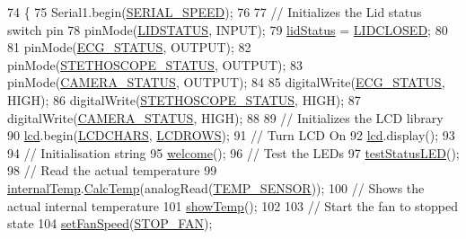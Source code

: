 \begin{DoxyCode}
\begin{DoxyCode}
\begin{DoxyCode}
\begin{DoxyCode}
74              \{
75   Serial1.begin(\hyperlink{_globals_8h_a4081bc1d938e0d9b2b0941e3a1143498}{SERIAL\_SPEED});
76 
77   \textcolor{comment}{// Initializes the Lid status switch pin}
78   pinMode(\hyperlink{_globals_8h_a9d1e04090b98f20c171c70e566a32e16}{LIDSTATUS}, INPUT);
79   \hyperlink{_meditech___chip_kit_control_panel_8pde_adea51712174a5f82a31231a67e0d4608}{lidStatus} = \hyperlink{_globals_8h_af04a3919dc1fa7d521c9514be995b43d}{LIDCLOSED};
80   
81   pinMode(\hyperlink{_globals_8h_a81c971d1ee27ca31e310c80ef260b390}{ECG\_STATUS}, OUTPUT);
82   pinMode(\hyperlink{_globals_8h_a8519a074bf27b6dcc876ce549b2f5ea7}{STETHOSCOPE\_STATUS}, OUTPUT);
83   pinMode(\hyperlink{_globals_8h_ad0154ccab9906702a495f07dfedd0136}{CAMERA\_STATUS}, OUTPUT);
84 
85   digitalWrite(\hyperlink{_globals_8h_a81c971d1ee27ca31e310c80ef260b390}{ECG\_STATUS}, HIGH);
86   digitalWrite(\hyperlink{_globals_8h_a8519a074bf27b6dcc876ce549b2f5ea7}{STETHOSCOPE\_STATUS}, HIGH);
87   digitalWrite(\hyperlink{_globals_8h_ad0154ccab9906702a495f07dfedd0136}{CAMERA\_STATUS}, HIGH);
88 
89   \textcolor{comment}{// Initializes the LCD library}
90   \hyperlink{_meditech___chip_kit_control_panel_8pde_ae0b100905fb0ed88dddaafda0aa05379}{lcd}.begin(\hyperlink{_l_c_d_8h_acea744bc7db589514d98dde1a19a4be6}{LCDCHARS}, \hyperlink{_l_c_d_8h_a1b8861bc5ab0412d754e0bd902c73bcf}{LCDROWS});
91   \textcolor{comment}{// Turn LCD On}
92   \hyperlink{_meditech___chip_kit_control_panel_8pde_ae0b100905fb0ed88dddaafda0aa05379}{lcd}.display();
93 
94   \textcolor{comment}{// Initialisation string}
95   \hyperlink{_meditech___chip_kit_control_panel_8pde_a236e454e493fc9b262f746305660a2eb}{welcome}();
96   \textcolor{comment}{// Test the LEDs}
97   \hyperlink{_meditech___chip_kit_control_panel_8pde_af1a6bbf84a5ea76623bdc49aaf642a28}{testStatusLED}();
98   \textcolor{comment}{// Read the actual temperature}
99   \hyperlink{_meditech___chip_kit_control_panel_8pde_adcfca3504612462229db71750def77f9}{internalTemp}.\hyperlink{class_temperature_a909c328fd6235d0e7c8ea110a1fb201d}{CalcTemp}(analogRead(\hyperlink{_temperature_8h_a16433c75f0d3615fe60d59ec8a86834a}{TEMP\_SENSOR}));
100   \textcolor{comment}{// Shows the actual internal temperature}
101   \hyperlink{_meditech___chip_kit_control_panel_8pde_a89c0a8283a410b693ebef39173a8f493}{showTemp}();
102   
103   \textcolor{comment}{// Start the fan to stopped state}
104   \hyperlink{_meditech___chip_kit_control_panel_8pde_ac0f1975168c58bd48fc29f8e3004a5a8}{setFanSpeed}(\hyperlink{_globals_8h_a1c75f833b458a1118ffc6e8ff1086bd8}{STOP\_FAN});

\end{DoxyCode}
\end{DoxyCode}
\end{DoxyCode}
\end{DoxyCode}
